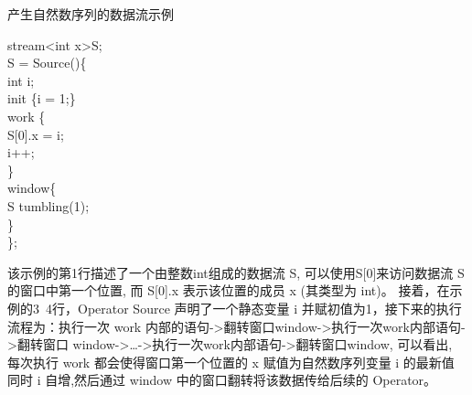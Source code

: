 \begin{algorithm}\caption{产生自然数序列的数据流示例}\label{algo:operator-example}
  stream<int x>S;\\
  S = Source()\{\\
  \hspace*{1 pc} int i;\\
  \hspace*{1 pc} init \{i = 1;\}\\
  \hspace*{1 pc} work \{\\
  \hspace*{2 pc} S[0].x = i;\\
  \hspace*{2 pc} i++;\\
  \hspace*{1 pc} \}\\
  \hspace*{1 pc} window\{\\
  \hspace*{2 pc} S tumbling(1);\\
  \hspace*{1 pc} \}\\
  \};
\end{algorithm}

该示例的第1行描述了一个由整数int组成的数据流 S, 可以使用S[0]来访问数据流 S 的窗口中第一个位置, 而 S[0].x 表示该位置的成员 x (其类型为 int)。 接着，在示例的3~4行，Operator Source 声明了一个静态变量 i 并赋初值为1，接下来的执行流程为：执行一次 work 内部的语句->翻转窗口window->执行一次work内部语句->翻转窗口 window->…->执行一次work内部语句->翻转窗口window, 可以看出, 每次执行 work 都会使得窗口第一个位置的 x 赋值为自然数序列变量 i 的最新值 同时 i 自增,然后通过 window 中的窗口翻转将该数据传给后续的 Operator。

